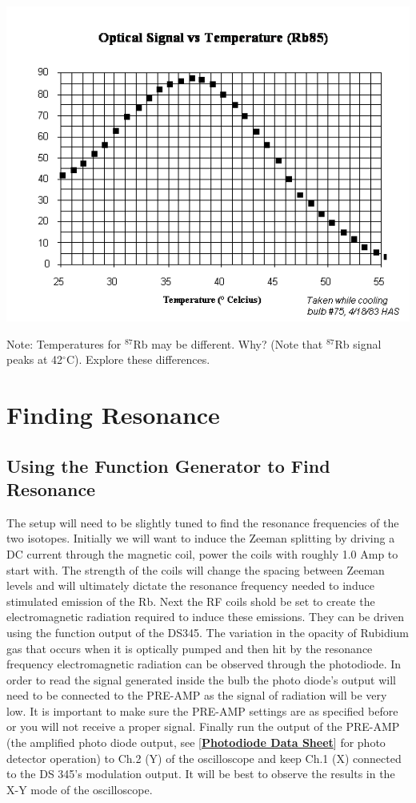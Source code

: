 \documentclass{../lab}
\newcommand{\PhotodiodeDataSheet}{http://physics111.lib.berkeley.edu/Physics111/Reprints/OPT/Photodiodes-10DP.pdf}
\begin{document}
{\hfil \includegraphics[width=0.8\linewidth]{images/SigVsTemp}}

\noindent Note: Temperatures for $^{87}$Rb may be different. Why? (Note that $^{87}$Rb signal peaks at 42$^\circ$C). Explore these differences.

\section{Finding Resonance}

\subsection{Using the Function Generator to Find Resonance}

The setup will need to be slightly tuned to find the resonance frequencies of the two isotopes. Initially we will want to induce the Zeeman splitting by driving a DC current through the magnetic coil, power the coils with roughly 1.0 Amp to start with. The strength of the coils will change the spacing between Zeeman levels and will ultimately dictate the resonance frequency needed to induce stimulated emission of the Rb. Next the RF coils shold be set to create the electromagnetic radiation required to induce these emissions. They can be driven using the function output of the DS345. The variation in the opacity of Rubidium gas that occurs when it is optically pumped and then hit by the resonance frequency electromagnetic radiation can be observed through the photodiode. In order to read the signal generated inside the bulb the photo diode's output will need to be connected to the PRE-AMP as the signal of radiation will be very low. It is important to make sure the PRE-AMP settings are as specified before or you will not receive a proper signal. Finally run the output of the PRE-AMP (the amplified photo diode output, see [\href{\PhotodiodeDataSheet}{\textbf{Photodiode Data Sheet}}] for photo detector operation) to Ch.2 (Y) of the oscilloscope and keep Ch.1 (X) connected to the DS 345's modulation output. It will be best to observe the results in the X-Y mode of the oscilloscope. \\
\end{document}
